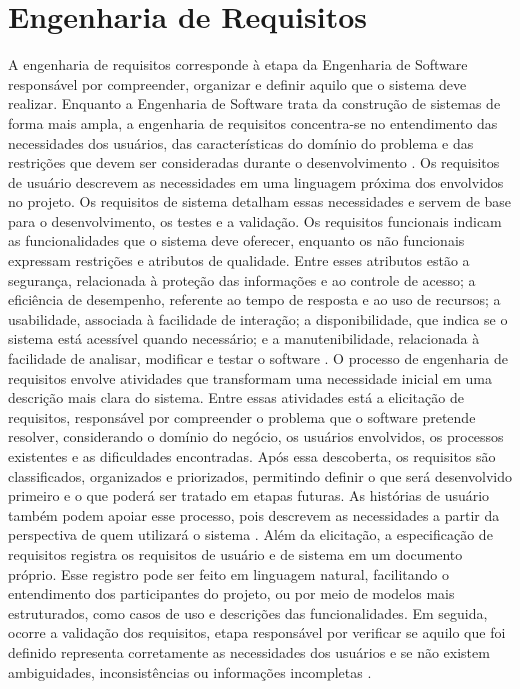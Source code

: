 \section{Engenharia de Requisitos}
A engenharia de requisitos corresponde à etapa da Engenharia de Software responsável por compreender, organizar e definir aquilo que o sistema deve realizar. Enquanto a Engenharia de Software trata da construção de sistemas de forma mais ampla, a engenharia de requisitos concentra-se no entendimento das necessidades dos usuários, das características do domínio do problema e das restrições que devem ser consideradas durante o desenvolvimento \cite{sommerville2016,swebok2024}.
Os requisitos de usuário descrevem as necessidades em uma linguagem próxima dos envolvidos no projeto. Os requisitos de sistema detalham essas necessidades e servem de base para o desenvolvimento, os testes e a validação. Os requisitos funcionais indicam as funcionalidades que o sistema deve oferecer, enquanto os não funcionais expressam restrições e atributos de qualidade. Entre esses atributos estão a segurança, relacionada à proteção das informações e ao controle de acesso; a eficiência de desempenho, referente ao tempo de resposta e ao uso de recursos; a usabilidade, associada à facilidade de interação; a disponibilidade, que indica se o sistema está acessível quando necessário; e a manutenibilidade, relacionada à facilidade de analisar, modificar e testar o software \cite{sommerville2016,swebok2024,iso25010_2023}.
O processo de engenharia de requisitos envolve atividades que transformam uma necessidade inicial em uma descrição mais clara do sistema. Entre essas atividades está a elicitação de requisitos, responsável por compreender o problema que o software pretende resolver, considerando o domínio do negócio, os usuários envolvidos, os processos existentes e as dificuldades encontradas. Após essa descoberta, os requisitos são classificados, organizados e priorizados, permitindo definir o que será desenvolvido primeiro e o que poderá ser tratado em etapas futuras. As histórias de usuário também podem apoiar esse processo, pois descrevem as necessidades a partir da perspectiva de quem utilizará o sistema \cite{sommerville2016,swebok2024}.
Além da elicitação, a especificação de requisitos registra os requisitos de usuário e de sistema em um documento próprio. Esse registro pode ser feito em linguagem natural, facilitando o entendimento dos participantes do projeto, ou por meio de modelos mais estruturados, como casos de uso e descrições das funcionalidades. Em seguida, ocorre a validação dos requisitos, etapa responsável por verificar se aquilo que foi definido representa corretamente as necessidades dos usuários e se não existem ambiguidades, inconsistências ou informações incompletas \cite{sommerville2016,swebok2024}.
